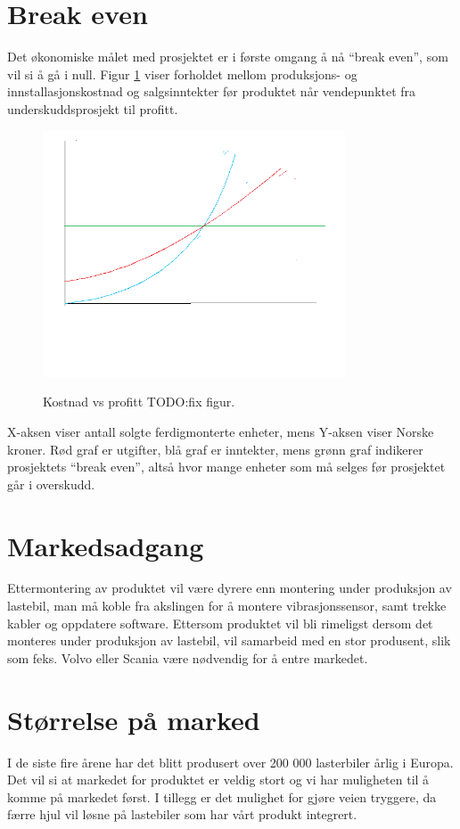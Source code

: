 \section{Break even}
Det økonomiske målet med prosjektet er i første omgang å nå ``break even'', 
som vil si å gå i null. Figur \ref{fig:breakeven} viser forholdet mellom 
produksjons- og innstallasjonskostnad og salgsinntekter før produktet når 
vendepunktet fra underskuddsprosjekt til profitt. 
	\newline
	\begin{figure}[H]
		\centering
		\includegraphics[width=0.80\textwidth]{images/break-even.png}
		\label{fig:breakeven}
		\caption{Kostnad vs profitt TODO:fix figur.}
	\end{figure}
X-aksen viser antall solgte ferdigmonterte enheter, mens Y-aksen viser 
Norske kroner. Rød graf er utgifter, blå graf er inntekter, mens grønn graf 
indikerer prosjektets ``break even'', altså hvor mange enheter som må selges 
før prosjektet går i overskudd.

\section{Markedsadgang}
Ettermontering av produktet vil være dyrere enn montering under produksjon av 
lastebil, man må koble fra akslingen for å montere vibrasjonssensor, samt 
trekke kabler og oppdatere software. Ettersom produktet vil bli rimeligst 
dersom det monteres under produksjon av lastebil, vil  samarbeid med en stor 
produsent, slik som feks. Volvo eller Scania være nødvendig for å entre markedet. 

\section{Størrelse på marked}
I de siste fire årene har det blitt produsert over 200 000 lasterbiler årlig 
i Europa\cite{lastebilprod-DAF}. Det vil si at markedet for produktet er 
veldig stort og vi har muligheten til å komme på markedet først. I tillegg er 
det mulighet for gjøre veien tryggere, da færre hjul vil løsne på lastebiler 
som har vårt produkt integrert.

